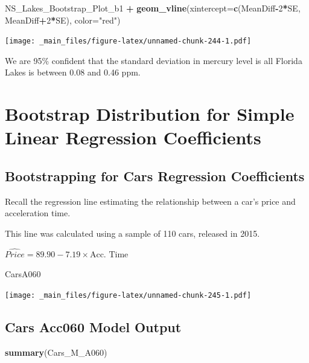 \documentclass[]{book}
\newenvironment{Shaded}{\begin{snugshade}}{\end{snugshade}}
\newcommand{\KeywordTok}[1]{\textcolor[rgb]{0.13,0.29,0.53}{\textbf{#1}}}
\newcommand{\DataTypeTok}[1]{\textcolor[rgb]{0.13,0.29,0.53}{#1}}
\newcommand{\DecValTok}[1]{\textcolor[rgb]{0.00,0.00,0.81}{#1}}
\newcommand{\StringTok}[1]{\textcolor[rgb]{0.31,0.60,0.02}{#1}}
\newcommand{\OperatorTok}[1]{\textcolor[rgb]{0.81,0.36,0.00}{\textbf{#1}}}
\newcommand{\NormalTok}[1]{#1}
\begin{document}
\begin{Shaded}
\begin{Highlighting}[]
\NormalTok{NS_Lakes_Bootstrap_Plot_b1  }\OperatorTok{+}\StringTok{ }\KeywordTok{geom_vline}\NormalTok{(}\DataTypeTok{xintercept=}\KeywordTok{c}\NormalTok{(MeanDiff}\OperatorTok{-}\DecValTok{2}\OperatorTok{*}\NormalTok{SE, MeanDiff}\OperatorTok{+}\DecValTok{2}\OperatorTok{*}\NormalTok{SE), }\DataTypeTok{color=}\StringTok{"red"}\NormalTok{) }
\end{Highlighting}
\end{Shaded}

\texttt{[image: \_main\_files/figure-latex/unnamed-chunk-244-1.pdf]}

We are 95\% confident that the standard deviation in mercury level is
all Florida Lakes is between 0.08 and 0.46 ppm.

\section{Bootstrap Distribution for Simple Linear Regression
Coefficients}\label{bootstrap-distribution-for-simple-linear-regression-coefficients}

\subsection{Bootstrapping for Cars Regression
Coefficients}\label{bootstrapping-for-cars-regression-coefficients}

Recall the regression line estimating the relationship between a car's
price and acceleration time.

This line was calculated using a sample of 110 cars, released in 2015.

\(\widehat{Price} = 89.90 - 7.19\times\text{Acc. Time}\)

\begin{Shaded}
\begin{Highlighting}[]
\NormalTok{CarsA060}
\end{Highlighting}
\end{Shaded}

\texttt{[image: \_main\_files/figure-latex/unnamed-chunk-245-1.pdf]}

\subsection{Cars Acc060 Model Output}\label{cars-acc060-model-output}

\begin{Shaded}
\begin{Highlighting}[]
\KeywordTok{summary}\NormalTok{(Cars_M_A060)}
\end{Highlighting}
\end{Shaded}
\end{document}

